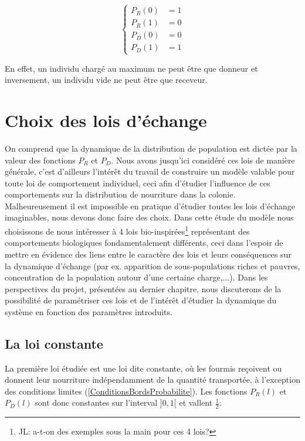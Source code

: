 \begin{equation}
\left \{
\begin{aligned}
P_R(0)&=1 \\
P_R(1)&=0 \\
P_D(0)&=0 \\
P_D(1)&=1
\end{aligned}
\right.
\label{ConditionsBordsProbabilite}
\end{equation}

En effet, un individu chargé au maximum ne peut être que donneur et inversement, un individu vide ne peut être que receveur.






\section{Choix des lois d'échange}

On comprend que la dynamique de la distribution de population est dictée par la valeur des fonctions $P_R$ et $P_D$. Nous avons jusqu'ici considéré ces lois de manière générale, c'est d'ailleurs l'intérêt du travail de construire un modèle valable pour toute loi de comportement individuel, ceci afin d'étudier l'influence de ces comportements sur la distribution de nourriture dans la colonie.\\

Malheureusement il est impossible en pratique d'étudier toutes les lois d'échange imaginables, nous devons donc faire des choix. Dans cette étude du modèle nous choisissons de nous intéresser à 4 lois bio-inspirées\footnote{JL: a-t-on des exemples sous la main pour ces 4 lois?} représentant des comportements biologiques fondamentalement différents, ceci dans l'espoir de mettre en évidence des liens entre le caractère des lois et leurs conséquences sur la dynamique d'échange (par ex. apparition de sous-populations riches et pauvres, concentration de la population autour d'une certaine charge,...). Dans les perspectives du projet, présentées au dernier chapitre, nous discuterons de la possibilité de paramétriser ces lois et de l'intérêt d'étudier la dynamique du système en fonction des paramètres introduits.\\


\subsection{La loi constante}

La première loi étudiée est une loi dite constante, où les fourmis reçoivent ou donnent leur nourriture indépendamment de la quantité transportée, à l'exception des conditions limites (\ref{ConditionsBordsProbabilite}). Les fonctions $P_R(l)$ et $P_D(l)$ sont donc constantes sur l'interval $]0,1[$ et vallent $\frac{1}{2}$:\\

